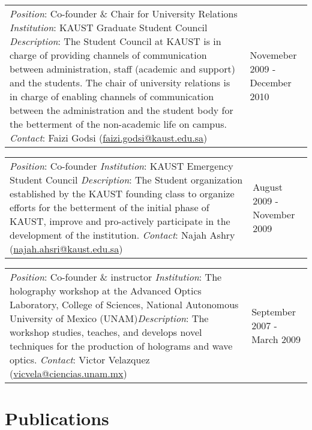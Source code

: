 \documentclass[margin,10pt]{res}
\newcommand{\UNAM}{National Autonomous University of Mexico (UNAM)}
\begin{document}
\begin{tabular}{p{3.8in} l}
 \emph{Position}: Co-founder \& Chair for University Relations \newline \emph{Institution}: KAUST Graduate Student Council \newline \emph{Description}: The Student Council at KAUST is in charge of providing channels of communication between administration, staff (academic and support) and the students. The chair of university relations is in charge of enabling channels of communication between the administration and the student body for the betterment of the non-academic life on campus. \newline \emph{Contact}: Faizi Godsi (\href{mailto:faizi.godsi@kaust.edu.sa}{faizi.godsi@kaust.edu.sa}) \newline & Novemeber 2009 - December 2010 
\end{tabular}

\begin{tabular}{p{3.8in} l}
 \emph{Position}: Co-founder \newline \emph{Institution}: KAUST Emergency Student Council \newline \emph{Description}: The Student organization established by the KAUST founding class to organize efforts for the betterment of the initial phase of KAUST, improve and pro-actively participate in the development of the institution. \newline \emph{Contact}: Najah Ashry (\href{mailto:najah.ahsri@kaust.edu.sa}{najah.ahsri@kaust.edu.sa}) \newline & August 2009 - November 2009 
\end{tabular}

\begin{tabular}{p{3.8in} l}
 \emph{Position}: Co-founder \& instructor \newline \emph{Institution}: The holography workshop at the Advanced Optics Laboratory, College of Sciences, \UNAM \newline \emph{Description}: The workshop studies, teaches,  and develops novel techniques for the production of holograms and wave optics.  \newline \emph{Contact}: Victor Velazquez (\href{mailto:vicvela@ciencias.unam.mx}{vicvela@ciencias.unam.mx}) \newline & September 2007 - March 2009 
\end{tabular}


\section{Publications}
\end{document}
